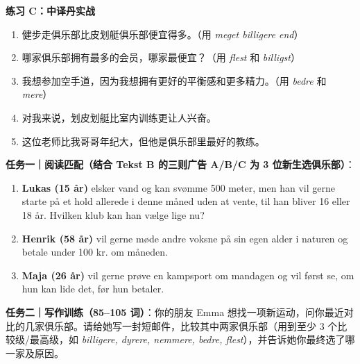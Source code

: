 \textbf{练习 C：中译丹实战}
\begin{enumerate}
  \item 健步走俱乐部比皮划艇俱乐部便宜得多。（用 \textit{meget billigere end}）
  \item 哪家俱乐部拥有最多的会员，哪家最便宜？（用 \textit{flest} 和 \textit{billigst}）
  \item 我想参加空手道，因为我想拥有更好的平衡感和更多精力。（用 \textit{bedre} 和 \textit{mere}）
  \item 对我来说，划皮划艇比室内训练更让人兴奋。
  \item 这位老师比我哥哥年纪大，但他是俱乐部里最好的教练。
\end{enumerate}


\begin{tcolorbox}[enhanced, breakable, colback=NCDBgGray, colframe=NCDGray, coltitle=white, fonttitle=\bfseries, title={Modul 2 阅读理解进阶 + 比较类短邮实战}, arc=2pt, boxrule=0.8pt, borderline west={3pt}{0pt}{NCDRed}, left=10pt, right=10pt, top=7pt, bottom=7pt]
\small
\textbf{任务一｜阅读匹配（结合 Tekst B 的三则广告 A/B/C 为 3 位新生选俱乐部）}：
\begin{enumerate}
  \item \textbf{Lukas (15 år)} elsker vand og kan svømme 500 meter, men han vil gerne starte på et hold allerede i denne måned uden at vente, til han bliver 16 eller 18 år. Hvilken klub kan han vælge lige nu? \underline{\hspace{1.8cm}}
  \item \textbf{Henrik (58 år)} vil gerne møde andre voksne på sin egen alder i naturen og betale under 100 kr. om måneden. \underline{\hspace{1.8cm}}
  \item \textbf{Maja (26 år)} vil gerne prøve en kampsport om mandagen og vil først se, om hun kan lide det, før hun betaler. \underline{\hspace{1.8cm}}
\end{enumerate}

\vspace{0.35em}
\textbf{任务二｜写作训练（85--105 词）}：你的朋友 Emma 想找一项新运动，问你最近对比的几家俱乐部。请给她写一封短邮件，比较其中两家俱乐部（用到至少 3 个比较级/最高级，如 \textit{billigere, dyrere, nemmere, bedre, flest}），并告诉她你最终选了哪一家及原因。
\end{tcolorbox}

